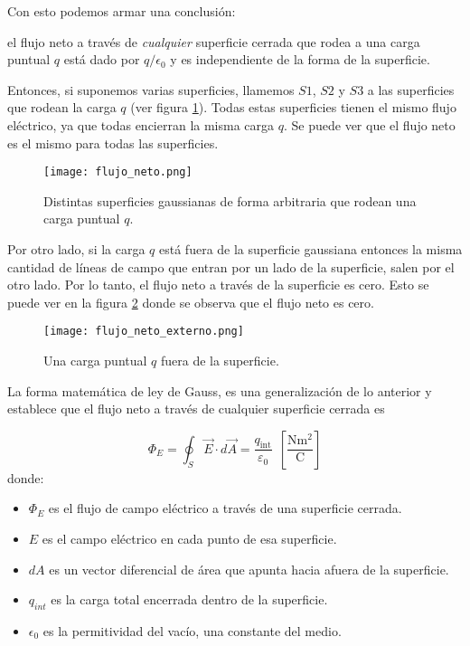 Con esto podemos armar una conclusión:

\begin{tcolorbox}[myconclusion]
    el flujo neto a través de \textit{cualquier} superficie cerrada que rodea a una carga puntual \(q\) está dado por \(q/\epsilon_0\) y es independiente de la forma de la superficie.
\end{tcolorbox}

Entonces, si suponemos varias superficies, llamemos \(S1\), \(S2\) y \(S3\) a las superficies que rodean la carga \(q\) (ver figura \ref{fig:superficie_gaussiana_arbitraria}). Todas estas superficies tienen el mismo flujo eléctrico, ya que todas encierran la misma carga \(q\). Se puede ver que el flujo neto es el mismo para todas las superficies.

\begin{figure}[ht]
    \centering
    \texttt{[image: flujo\_neto.png]}
    \caption{Distintas superficies gaussianas de forma arbitraria que rodean una carga puntual \(q\).}
    \label{fig:superficie_gaussiana_arbitraria}
\end{figure}

Por otro lado, si la carga \(q\) está fuera de la superficie gaussiana entonces la misma cantidad de líneas de campo que entran por un lado de la superficie, salen por el otro lado. Por lo tanto, el flujo neto a través de la superficie es cero. Esto se puede ver en la figura \ref{fig:flujo_neto_2} donde se observa que el flujo neto es cero.

\begin{figure}[ht]
    \centering
    \texttt{[image: flujo\_neto\_externo.png]}
    \caption{Una carga puntual \(q\) fuera de la superficie.}
    \label{fig:flujo_neto_2}
\end{figure}

La forma matemática de ley de Gauss, es una generalización de lo anterior y establece que el flujo neto a través de cualquier superficie cerrada es

\begin{equation}
    \Phi_E = \oint_{S} \vec{E} \cdot d\vec{A} = \frac{q_{\text{int}}}{\varepsilon_0} ~~ \left[\frac{\si{\newton \meter \squared}}{\si{\coulomb}}\right]
\end{equation}
donde:
\begin{itemize}
    \item \( \Phi_E \) es el flujo de campo eléctrico a través de una superficie cerrada.
    \item \(E\) es el campo eléctrico en cada punto de esa superficie.
    \item \(dA\) es un vector diferencial de área que apunta hacia afuera de la superficie.
    \item \(q_{int}\) es la carga total encerrada dentro de la superficie.
    \item \(\epsilon_0\) es la permitividad del vacío, una constante del medio.
\end{itemize}

